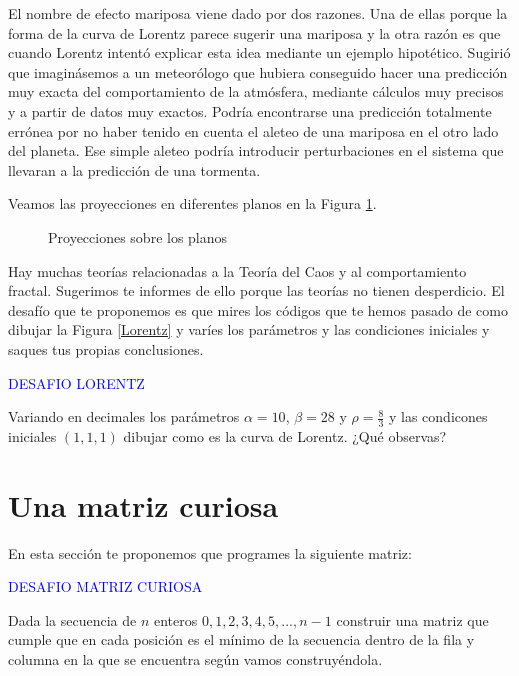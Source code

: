 El nombre de efecto mariposa viene dado por dos razones. Una de ellas porque la forma de la curva de Lorentz parece sugerir una mariposa y la otra razón es que cuando Lorentz intentó explicar esta idea mediante un ejemplo hipotético. Sugirió que imaginásemos a un meteorólogo que hubiera conseguido hacer una predicción muy exacta del comportamiento de la
atmósfera, mediante cálculos muy precisos y a partir de datos muy exactos. Podría encontrarse una
predicción totalmente errónea por no haber tenido en cuenta el aleteo de una mariposa en el otro
lado del planeta. Ese simple aleteo podría introducir perturbaciones en el sistema que llevaran a la predicción de una tormenta. 

Veamos las proyecciones en diferentes planos en la Figura \ref{proyecciones}.

\begin{figure}[ht!]
\centering \scalebox{0.4}{}\caption{Proyecciones sobre los planos}\label{proyecciones}
\end{figure}

Hay muchas teorías relacionadas a la Teoría del Caos y al comportamiento fractal. Sugerimos te informes de ello porque las teorías no tienen desperdicio. El desafío que te proponemos es que mires los códigos que te hemos pasado de como dibujar la Figura \ref{Lorentz} y varíes los parámetros y las condiciones iniciales y saques tus propias conclusiones.

\begin{mybox}
  \begin{center}\textcolor{blue}{DESAFIO LORENTZ}\end{center}

  Variando en decimales los parámetros $\alpha=10$, $\beta=28$ y $\rho=\frac{8}{3}$ y las condicones iniciales $(1,1,1)$ dibujar como es la curva de Lorentz. ¿Qué observas?
\end{mybox}


\section{Una matriz curiosa}
En esta sección te proponemos que programes la siguiente matriz:
\begin{mybox}
  \begin{center}\textcolor{blue}{DESAFIO MATRIZ CURIOSA}\end{center}
   Dada la secuencia de $n$ enteros $0,1,2,3,4,5,...,n-1$ construir una matriz que cumple que en cada posición es el mínimo de la secuencia dentro de la fila y columna en la que se encuentra según vamos construyéndola.
\end{mybox}

